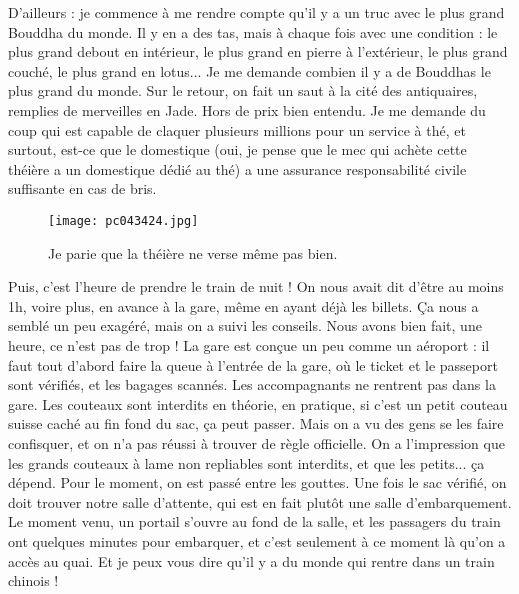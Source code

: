 \documentclass{book}
\begin{document}
D'ailleurs : je commence à me rendre compte qu'il y a un truc avec le plus grand Bouddha du monde. Il y en a des tas, mais à chaque fois avec une condition : le plus grand debout en intérieur, le plus grand en pierre à l'extérieur, le plus grand couché, le plus grand en lotus... Je me demande combien il y a de Bouddhas le plus grand du monde.
Sur le retour, on fait un saut à la cité des antiquaires, remplies de merveilles en Jade. Hors de prix bien entendu. Je me demande du coup qui est capable de claquer plusieurs millions pour un service à thé, et surtout, est-ce que le domestique (oui, je pense que le mec qui achète cette théière a un domestique dédié au thé) a une assurance responsabilité civile suffisante en cas de bris.


\begin{figure}[h]
\centering
\texttt{[image: pc043424.jpg]}
\caption*{ Je parie que la théière ne verse même pas bien.}
\end{figure}

Puis, c'est l'heure de prendre le train de nuit ! On nous avait dit d'être au moins 1h, voire plus, en avance à la gare, même en ayant déjà les billets. Ça nous a semblé un peu exagéré, mais on a suivi les conseils. Nous avons bien fait, une heure, ce n'est pas de trop ! La gare est conçue un peu comme un aéroport : il faut tout d'abord faire la queue à l'entrée de la gare, où le ticket et le passeport sont vérifiés, et les bagages scannés. Les accompagnants ne rentrent pas dans la gare. Les couteaux sont interdits en théorie, en pratique, si c'est un petit couteau suisse caché au fin fond du sac, ça peut passer. Mais on a vu des gens se les faire confisquer, et on n'a pas réussi à trouver de règle officielle. On a l'impression que les grands couteaux à lame non repliables sont interdits, et que les petits... ça dépend. Pour le moment, on est passé entre les gouttes. Une fois le sac vérifié, on doit trouver notre salle d'attente, qui est en fait plutôt une salle d'embarquement. Le moment venu, un portail s'ouvre au fond de la salle, et les passagers du train ont quelques minutes pour embarquer, et c'est seulement à ce moment là qu'on a accès au quai. Et je peux vous dire qu'il y a du monde qui rentre dans un train chinois !
\end{document}
